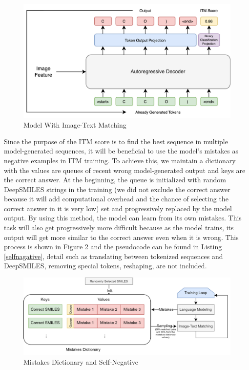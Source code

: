 \documentclass[12pt]{article}
\begin{document}
\begin{figure}
    \centering
    \includegraphics[width=0.8\linewidth]{itm.drawio.png}
    \caption{Model With Image-Text Matching}
    \label{fig:itm}
\end{figure}
Since the purpose of the ITM score is to find the best sequence in multiple model-generated sequences, it will be beneficial to use the model's mistakes as negative examples in ITM training. To achieve this, we maintain a dictionary with the values are queues of recent wrong model-generated output and keys are the correct answer. At the beginning, the queue is initialized with random DeepSMILES strings in the training (we did not exclude the correct answer because it will add computational overhead and the chance of selecting the correct answer in it is very low) set and progressively replaced by the model output. By using this method, the model can learn from its own mistakes. This task will also get progressively more difficult because as the model trains, its output will get more similar to the correct answer even when it is wrong. This process is shown in Figure \ref{fig:selfnegative} and the pseudocode can be found in Listing \ref{selfnagative}, detail such as translating between tokenized sequences and DeepSMILES, removing special tokens, reshaping, are not included.   
\begin{figure}[t]
    \centering
    \includegraphics[width=0.8\linewidth]{selfnegative.drawio.png}
    \caption{Mistakes Dictionary and Self-Negative}
    \label{fig:selfnegative}
\end{figure}
\end{document}
